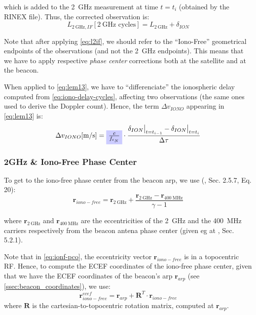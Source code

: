 which is added to the \SI{2}{\GHz} measurement at time $t=t_i$ (obtained by the 
RINEX file). Thus, the corrected observation is:
\begin{equation}
  L_{\SI{2}{\GHz},IF} [\SI{2}{\GHz}\text{ cycles}] = 
    L_{\SI{2}{\GHz}} + \delta_{ION}
  \label{eq:l2if}
\end{equation}

Note that after applying \ref{eq:l2if}, we should refer to the ``Iono-Free'' 
geometrical endpoints of the observations (and not the \SI{2}{\GHz} endpoints). 
This means that we have to apply respective \emph{phase center} corrections 
both at the satellite and at the beacon.

When applied to \ref{eq:lem13}, we have to ``differenciate'' the ionospheric 
delay computed from \ref{eq:iono-delay-cycles}, affecting two observations 
(the same ones used to derive the Doppler count). Hence, the term 
$\Delta v_{IONO}$ appearing in \ref{eq:lem13} is:
\begin{equation}
  \Delta v_{IONO} [\si{\m \per \s}] = 
    \tikz[baseline]{
      \node[fill=blue!20,anchor=base](en1){$\frac{c}{f_{e_N}}$};
    }
    \cdot 
    \frac{\delta_{ION}\at[\big]{t=t_{i-1}} 
    - \delta_{ION}\at[\big]{t=t_i}}{\Delta \tau}
  \label{eq:dion-diff}
\end{equation}

\subsubsection{2GHz \& Iono-Free Phase Center}
\label{sssec:2ghz-ionofree-pco}
To get to the iono-free phase center from the beacon \gls{arp}, 
we use (\cite{lemoine-2016}, Sec. 2.5.7, Eq. 20):
\begin{equation}
  \bm{r}_{iono-free} = \bm{r}_{\SI{2}{\GHz}} + \frac{\bm{r}_{\SI{2}{\GHz}} 
    - \bm{r}_{\SI{400}{\MHz}}}{\gamma - 1}
  \label{eq:ionf-pco}
\end{equation}

where $\bm{r}_{\SI{2}{\GHz}}$ and $\bm{r}_{\SI{400}{\MHz}}$ are the 
eccentricities of the \SI{2}{\GHz} and the \SI{400}{\MHz} carriers respectively 
from the beacon antena phase center (given eg at \cite{DORISGSM}, Sec. 5.2.1).

Note that in \ref{eq:ionf-pco}, the eccentricity vector $\bm{r}_{iono-free}$ 
is in a topocentric RF. Hence, to compute the ECEF coordinates of the 
iono-free phase center, given that we have the ECEF coordinates of the beacon's 
\gls{arp} $\bm{r}_{arp}$ (see \ref{ssec:beacon_coordinates}), we use:
\begin{equation}
  \bm{r}^{ecef}_{iono-free} = \bm{r}_{arp} + \bm{R}^T \cdot \bm{r}_{iono-free}
  \label{eq:arp-to-if-pc}
\end{equation}
where $\bm{R}$ is the cartesian-to-topocentric rotation matrix, computed 
at $\bm{r}_{arp}$.

